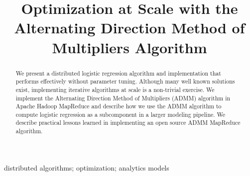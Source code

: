 \documentclass[10pt, conference, compsocconf]{IEEEtran}
\begin{document}
%
\title{Optimization at Scale with the\\ Alternating Direction Method of Multipliers Algorithm}



\author{
}






\maketitle


\begin{abstract}
We present a distributed logistic regression algorithm and implementation that performs effectively without parameter tuning.
Although many well known solutions exist, implementing iterative algorithms at scale is a non-trivial exercise.  We implement the Alternating Direction Method of Multipliers (ADMM) algorithm in Apache Hadoop MapReduce and describe how we use the ADMM algorithm to compute logistic regression as a subcomponent in a larger modeling pipeline.  We describe practical lessons learned in implementing an open source ADMM MapReduce algorithm.
\end{abstract}

\begin{IEEEkeywords}
distributed algorithms; optimization; analytics models
\end{IEEEkeywords}


%
\IEEEpeerreviewmaketitle
\end{document}
